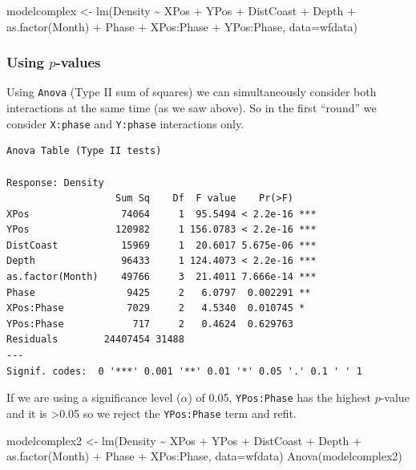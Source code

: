 \documentclass[
  oneside]{krantz}
\newenvironment{Shaded}{\begin{snugshade}}{\end{snugshade}}
\newcommand{\AttributeTok}[1]{\textcolor[rgb]{0.77,0.63,0.00}{#1}}
\newcommand{\FunctionTok}[1]{\textcolor[rgb]{0.00,0.00,0.00}{#1}}
\newcommand{\NormalTok}[1]{#1}
\newcommand{\OtherTok}[1]{\textcolor[rgb]{0.56,0.35,0.01}{#1}}
\newcommand{\SpecialCharTok}[1]{\textcolor[rgb]{0.00,0.00,0.00}{#1}}
\begin{document}
\begin{Shaded}
\begin{Highlighting}[]
\NormalTok{modelcomplex }\OtherTok{\textless{}{-}} \FunctionTok{lm}\NormalTok{(Density }\SpecialCharTok{\textasciitilde{}}\NormalTok{ XPos }\SpecialCharTok{+}\NormalTok{ YPos }\SpecialCharTok{+}\NormalTok{ DistCoast }\SpecialCharTok{+}\NormalTok{ Depth }\SpecialCharTok{+} \FunctionTok{as.factor}\NormalTok{(Month) }\SpecialCharTok{+}  
\NormalTok{                     Phase }\SpecialCharTok{+}\NormalTok{ XPos}\SpecialCharTok{:}\NormalTok{Phase }\SpecialCharTok{+}\NormalTok{ YPos}\SpecialCharTok{:}\NormalTok{Phase, }\AttributeTok{data=}\NormalTok{wfdata)}
\end{Highlighting}
\end{Shaded}

\hypertarget{using-p-values}{%
\subsubsection{\texorpdfstring{Using \(p\)-values}{Using p-values}}\label{using-p-values}}

Using \texttt{Anova} (Type II sum of squares) we can simultaneously consider both interactions at the same time (as we saw above). So in the first ``round'' we consider \texttt{X:phase} and \texttt{Y:phase} interactions only.

\begin{verbatim}
Anova Table (Type II tests)

Response: Density
                   Sum Sq    Df  F value    Pr(>F)    
XPos                74064     1  95.5494 < 2.2e-16 ***
YPos               120982     1 156.0783 < 2.2e-16 ***
DistCoast           15969     1  20.6017 5.675e-06 ***
Depth               96433     1 124.4073 < 2.2e-16 ***
as.factor(Month)    49766     3  21.4011 7.666e-14 ***
Phase                9425     2   6.0797  0.002291 ** 
XPos:Phase           7029     2   4.5340  0.010745 *  
YPos:Phase            717     2   0.4624  0.629763    
Residuals        24407454 31488                       
---
Signif. codes:  0 '***' 0.001 '**' 0.01 '*' 0.05 '.' 0.1 ' ' 1
\end{verbatim}

If we are using a significance level (\(\alpha\)) of 0.05, \texttt{YPos:Phase} has the highest \(p\)-value and it is \textgreater0.05 so we reject the \texttt{YPos:Phase} term and refit.

\begin{Shaded}
\begin{Highlighting}[]
\NormalTok{modelcomplex2 }\OtherTok{\textless{}{-}} \FunctionTok{lm}\NormalTok{(Density }\SpecialCharTok{\textasciitilde{}}\NormalTok{ XPos }\SpecialCharTok{+}\NormalTok{ YPos }\SpecialCharTok{+}\NormalTok{ DistCoast }\SpecialCharTok{+}\NormalTok{ Depth }\SpecialCharTok{+} \FunctionTok{as.factor}\NormalTok{(Month) }\SpecialCharTok{+}  
\NormalTok{                     Phase }\SpecialCharTok{+}\NormalTok{ XPos}\SpecialCharTok{:}\NormalTok{Phase, }\AttributeTok{data=}\NormalTok{wfdata)}
\FunctionTok{Anova}\NormalTok{(modelcomplex2)}
\end{Highlighting}
\end{Shaded}
\end{document}
